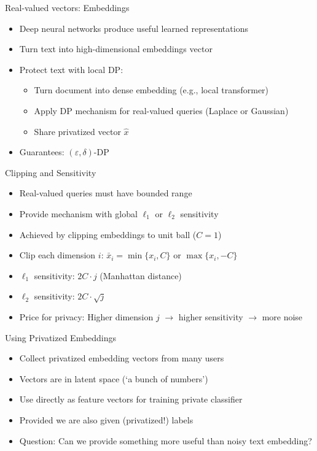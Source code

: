 \documentclass[12pt,aspectratio=169,handout]{beamer}
\begin{document}
\begin{frame}{Real-valued vectors: Embeddings}
\begin{itemize}
\item Deep neural networks produce useful learned representations
\item Turn text into high-dimensional embeddings vector
\item Protect text with local DP:
\begin{itemize}
\item Turn document into dense embedding (e.g., local transformer)
\item Apply DP mechanism for real-valued queries (Laplace or Gaussian)
\item Share privatized vector $\hat{x}$
\end{itemize}
\item Guarantees: $(\varepsilon, \delta)$-DP
\end{itemize}
\end{frame}

\begin{frame}{Clipping and Sensitivity}
\begin{itemize}
\item Real-valued queries must have bounded range
\item Provide mechanism with global $\ell_1$ or $\ell_2$ sensitivity
\item Achieved by clipping embeddings to unit ball ($C = 1$)
\item Clip each dimension $i$: $\bar{x}_i = \min \{x_i, C\}$ or $\max \{x_i, -C\}$
\item $\ell_1$ sensitivity: $2C \cdot j$ (Manhattan distance)
\item $\ell_2$ sensitivity: $2C \cdot \sqrt{j}$
\item Price for privacy: Higher dimension $j$ $\rightarrow$ higher sensitivity $\rightarrow$ more noise
\end{itemize}
\end{frame}

\begin{frame}{Using Privatized Embeddings}
\begin{itemize}
\item Collect privatized embedding vectors from many users
\item Vectors are in latent space (`a bunch of numbers')
\item Use directly as feature vectors for training private classifier
\item Provided we are also given (privatized!) labels
\item Question: Can we provide something more useful than noisy text embedding?
\end{itemize}
\end{frame}
\end{document}
